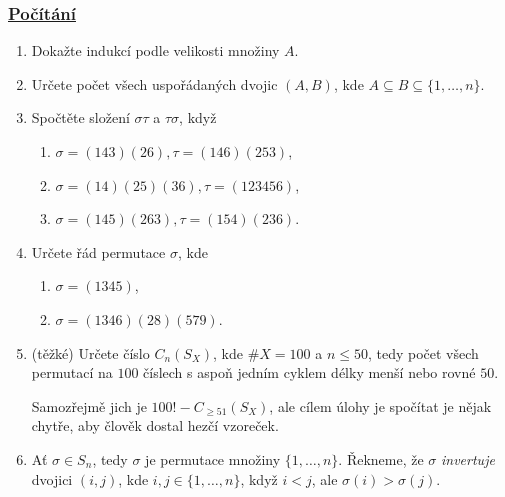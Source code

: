 \subsubsection*{\hyperref[sec:pocitani]{Počítání}}
\begin{enumerate}
 \item  Dokažte  indukcí podle
  velikosti množiny $A$.
 \item Určete počet všech uspořádaných dvojic $(A,B)$, kde $A \subseteq B
  \subseteq \{1,\ldots,n\}$.
 \item Spočtěte složení $\sigma\tau$ a $\tau\sigma$, když
  \begin{enumerate}
   \item $\sigma = (143)(26), \tau = (146)(253)$,
   \item $\sigma = (14)(25)(36), \tau = (123456)$,
   \item $\sigma = (145)(263), \tau = (154)(236)$.
  \end{enumerate}
 \item Určete řád permutace $\sigma$, kde
  \begin{enumerate}
   \item $\sigma = (1345)$,
   \item $\sigma = (1346)(28)(579)$.
  \end{enumerate}
 \item(těžké) Určete číslo $C_n(S_X)$, kde $\# X = 100$ a $n \leq 50$, tedy
  počet všech permutací na $100$ číslech s aspoň jedním cyklem délky menší nebo
  rovné $50$.

  Samozřejmě jich je $100! - C_{ \geq 51}(S_X)$, ale cílem úlohy je spočítat je
  nějak chytře, aby člověk dostal hezčí vzoreček.
 \item Ať $\sigma \in S_n$, tedy $\sigma$ je permutace množiny $\{1,\ldots,n\}$.
  Řekneme, že $\sigma$ \emph{invertuje} dvojici $(i,j)$, kde $i,j \in
  \{1,\ldots,n\}$, když $i<j$, ale $\sigma(i)>\sigma(j)$.


\end{enumerate}
